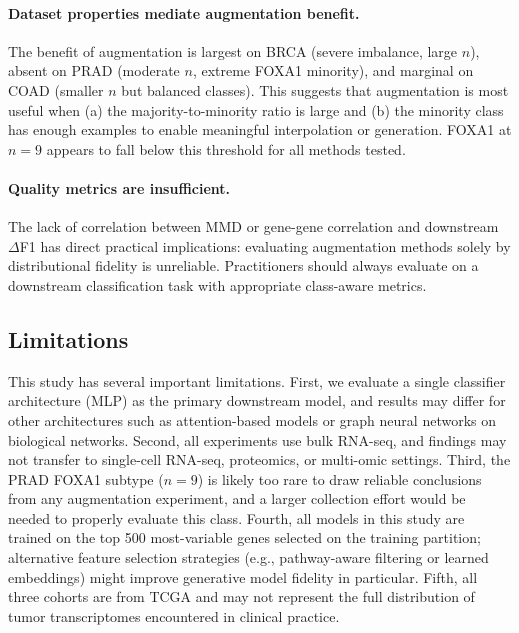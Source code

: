 \documentclass{article}
\begin{document}
\paragraph{Dataset properties mediate augmentation benefit.} The benefit of augmentation is
largest on BRCA (severe imbalance, large $n$), absent on PRAD (moderate $n$, extreme FOXA1
minority), and marginal on COAD (smaller $n$ but balanced classes). This suggests that
augmentation is most useful when (a) the majority-to-minority ratio is large and (b) the
minority class has enough examples to enable meaningful interpolation or generation. FOXA1 at
$n{=}9$ appears to fall below this threshold for all methods tested.

\paragraph{Quality metrics are insufficient.} The lack of correlation between MMD or gene-gene
correlation and downstream $\Delta$F1 has direct practical implications: evaluating augmentation
methods solely by distributional fidelity is unreliable. Practitioners should always evaluate on
a downstream classification task with appropriate class-aware metrics.

\subsection{Limitations}

This study has several important limitations. First, we evaluate a single classifier architecture
(MLP) as the primary downstream model, and results may differ for other architectures such as
attention-based models or graph neural networks on biological networks. Second, all experiments
use bulk RNA-seq, and findings may not transfer to single-cell RNA-seq, proteomics, or multi-omic
settings. Third, the PRAD FOXA1 subtype ($n{=}9$) is likely too rare to draw reliable conclusions
from any augmentation experiment, and a larger collection effort would be needed to properly
evaluate this class. Fourth, all models in this study are trained on the top 500 most-variable
genes selected on the training partition; alternative feature selection strategies (e.g.,
pathway-aware filtering or learned embeddings) might improve generative model fidelity in
particular. Fifth, all three cohorts are from TCGA and may not represent the full distribution of tumor transcriptomes
encountered in clinical practice.

\end{document}
